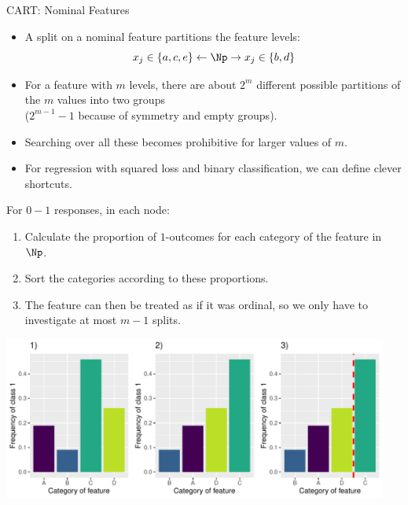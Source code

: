 \documentclass[11pt,compress,t,notes=noshow, xcolor=table]{beamer}
\newenvironment{knitrout}{}{} %
\begin{document}
\begin{vbframe}{CART: Nominal Features}
  \begin{itemize}
  \item A split on a nominal feature partitions the feature levels:
    $$x_j \in \{a,c,e\} \leftarrow \Np \rightarrow x_j \in \{b,d\} $$
  \item For a feature with $m$ levels,
  there are about $2^m$ different possible partitions of the $m$ values into two groups\\ ($2^{m-1} - 1$ because of symmetry and empty groups).
  \item Searching over all these becomes prohibitive for larger values of $m$.
  \item For regression with squared loss and binary classification, we can define clever shortcuts.
  \end{itemize}

  \framebreak

For $0-1$ responses, in each node:
  \begin{enumerate}
  \item Calculate the proportion of $1$-outcomes for each category of the feature in $\Np$.
  \item Sort the categories according to these proportions.
  \item The feature can then be treated as if it was ordinal, so we only have to investigate at most $m-1$ splits.
  \end{enumerate}

  \vspace{0.3cm}

\begin{knitrout}\scriptsize
{}\color{fgcolor}

{\centering \includegraphics[width=0.95\textwidth]{figure/cart_splitcomp_3} 

}



\end{knitrout}


\end{vbframe}
\end{document}
